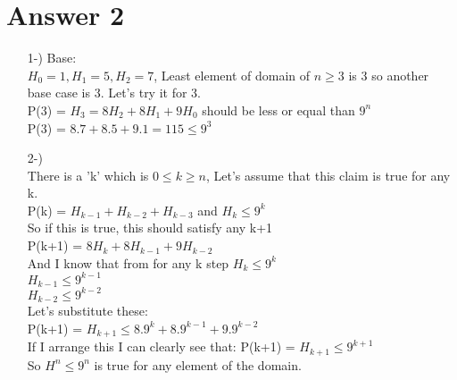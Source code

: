 \documentclass[12pt]{article}
\begin{document}
\section*{Answer 2}
\begin{enumerate}

    \item[1-) Base:]\\
        $H_0 = 1, H_1 = 5, H_2 = 7$, Least element of domain of $n \ge 3$ is 3 so another base case is 3. 
        Let's try it for 3. \\

        P(3) = $H_3 = 8H_2 + 8H_1 + 9H_0$ should be less or equal than $9^n$\\
        P(3) = $8.7 + 8.5 + 9.1 = 115 \le 9^3$

    \item[2-) ]\\
    There is a 'k' which is $0 \le k \ge n$, Let's assume that this claim is true for any k.\\
    P(k) = $H_{k-1}+H_{k-2}+H_{k-3}$ and $H_k \le 9^k$\\
    So if this is true, this should satisfy any k+1\\
    P(k+1) = $8H_k + 8H_{k-1} + 9H_{k-2}$\\
    And I know that from for any k step $H_k \le 9^k$\\
    $H_{k-1} \le 9^{k-1}$\\
    $H_{k-2} \le 9^{k-2}$\\
    
    Let's substitute these:\\
    P(k+1) = $H_{k+1} $$ \le 8.9^k+8.9^{k-1}+9.9^{k-2}$\\ If I arrange this I can clearly see that: P(k+1) = $H_{k+1} \le 9^{k+1}$\\

    So $H^n \le 9^n$ is true for any element of the domain.
    
    
\end{enumerate}
\end{document}

